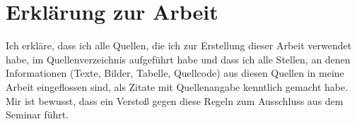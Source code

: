 \section*{Erklärung zur Arbeit}
    Ich erkläre, dass ich alle Quellen, die ich zur Erstellung dieser Arbeit verwendet habe, im Quellenverzeichnis aufgeführt habe und dass ich alle Stellen, an denen Informationen (Texte, Bilder, Tabelle, Quellcode) aus diesen Quellen in meine Arbeit eingeflossen sind, als Zitate mit Quellenangabe kenntlich gemacht habe. Mir ist bewusst, dass ein Verstoß gegen diese Regeln zum Ausschluss aus dem Seminar führt.

